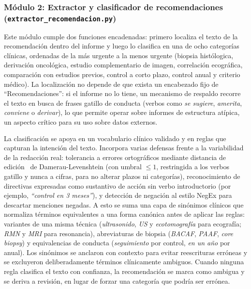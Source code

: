 \documentclass[10pt,journal,a4paper]{IEEEtran}
\newcommand{\codename}[1]{\texttt{#1}}
\begin{document}
\subsubsection{M\'odulo 2: Extractor y clasificador de recomendaciones (\codename{extractor\_recomendacion.py})}
Este m\'odulo cumple dos funciones encadenadas: primero localiza el texto de la recomendaci\'on dentro del informe y luego lo clasifica en una de ocho categor\'ias cl\'inicas, ordenadas de la m\'as urgente a la menos urgente (biopsia hist\'ologica, derivaci\'on oncol\'ogica, estudio complementario de imagen, correlaci\'on ecogr\'afica, comparaci\'on con estudios previos, control a corto plazo, control anual y criterio m\'edico). La localizaci\'on no depende de que exista un encabezado fijo de ``Recomendaciones'': si el informe no lo tiene, un mecanismo de respaldo recorre el texto en busca de frases gatillo de conducta (verbos como \emph{se sugiere}, \emph{amerita}, \emph{conviene} o \emph{derivar}), lo que permite operar sobre informes de estructura at\'ipica, un aspecto cr\'itico para su uso sobre datos externos.

La clasificaci\'on se apoya en un vocabulario cl\'inico validado y en reglas que capturan la intenci\'on del texto. Incorpora varias defensas frente a la variabilidad de la redacci\'on real: tolerancia a errores ortogr\'aficos mediante distancia de edici\'on~\cite{levenshtein1966binary} de Damerau-Levenshtein (con umbral $\leq 1$, restringida a los verbos gatillo y nunca a cifras, para no alterar plazos ni categor\'ias), reconocimiento de directivas expresadas como sustantivo de acci\'on sin verbo introductorio (por ejemplo, \emph{``control en 3 meses''}), y detecci\'on de negaci\'on al estilo NegEx para descartar menciones negadas. A esto se suma una capa de sin\'onimos cl\'inicos que normaliza t\'erminos equivalentes a una forma can\'onica antes de aplicar las reglas: variantes de una misma t\'ecnica (\emph{ultrasonido}, \emph{US} y \emph{ecotomograf\'ia} para ecograf\'ia; \emph{RMN} y \emph{MRI} para resonancia), abreviaturas de biopsia (\emph{BACAF}, \emph{PAAF}, \emph{core biopsy}) y equivalencias de conducta (\emph{seguimiento} por control, \emph{en un a\~no} por anual). Los sin\'onimos se anclaron con contexto para evitar reescrituras err\'oneas y se excluyeron deliberadamente t\'erminos cl\'inicamente ambiguos. Cuando ninguna regla clasifica el texto con confianza, la recomendaci\'on se marca como ambigua y se deriva a revisi\'on, en lugar de forzar una categor\'ia que podr\'ia ser err\'onea.
\end{document}
